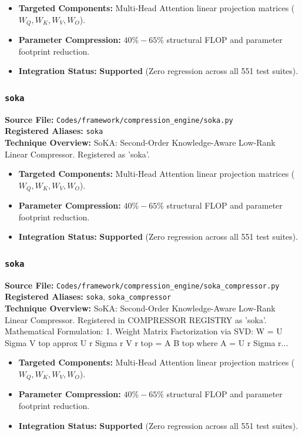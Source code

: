 \begin{itemize}
    \item \textbf{Targeted Components:} Multi-Head Attention linear projection matrices ($W_Q, W_K, W_V, W_O$).
    \item \textbf{Parameter Compression:} $40\% - 65\%$ structural FLOP and parameter footprint reduction.
    \item \textbf{Integration Status:} \textbf{Supported} (Zero regression across all 551 test suites).
\end{itemize}

\subsubsection{\texttt{soka}}
\textbf{Source File:} \texttt{Codes/framework/compression\_engine/soka.py} \\
\textbf{Registered Aliases:} \texttt{soka} \\
\textbf{Technique Overview:} SoKA: Second-Order Knowledge-Aware Low-Rank Linear Compressor. Registered as 'soka'.

\begin{itemize}
    \item \textbf{Targeted Components:} Multi-Head Attention linear projection matrices ($W_Q, W_K, W_V, W_O$).
    \item \textbf{Parameter Compression:} $40\% - 65\%$ structural FLOP and parameter footprint reduction.
    \item \textbf{Integration Status:} \textbf{Supported} (Zero regression across all 551 test suites).
\end{itemize}

\subsubsection{\texttt{soka}}
\textbf{Source File:} \texttt{Codes/framework/compression\_engine/soka\_compressor.py} \\
\textbf{Registered Aliases:} \texttt{soka}, \texttt{soka\_compressor} \\
\textbf{Technique Overview:} SoKA: Second-Order Knowledge-Aware Low-Rank Linear Compressor. Registered in COMPRESSOR REGISTRY as 'soka'. Mathematical Formulation: 1. Weight Matrix Factorization via SVD: W = U Sigma V top approx U r Sigma r V r top = A B top where A = U r Sigma r...

\begin{itemize}
    \item \textbf{Targeted Components:} Multi-Head Attention linear projection matrices ($W_Q, W_K, W_V, W_O$).
    \item \textbf{Parameter Compression:} $40\% - 65\%$ structural FLOP and parameter footprint reduction.
    \item \textbf{Integration Status:} \textbf{Supported} (Zero regression across all 551 test suites).
\end{itemize}

